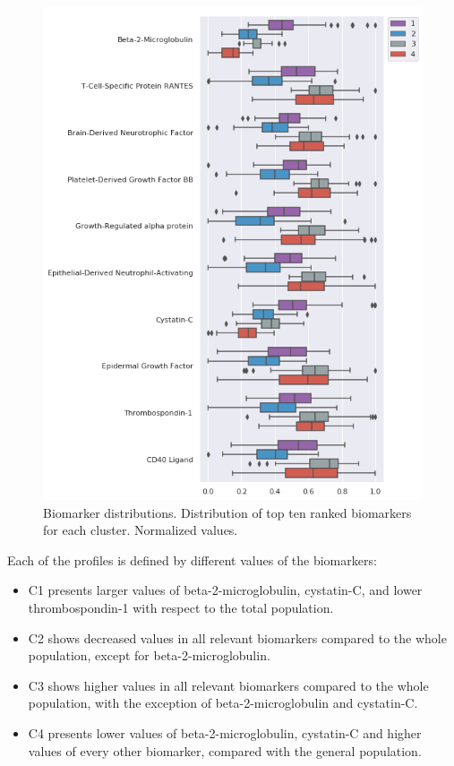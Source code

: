 \begin{figure}[!htbp]
\centering
\includegraphics[width=1.0\textwidth]{figures/cimlr/cluster_dist.png}
    \caption[Biomarker distributions.]{Biomarker distributions. Distribution of top ten ranked biomarkers for each cluster. Normalized values.}
    \label{boxplot}
\end{figure}

Each of the profiles is defined by different values of the biomarkers:

\begin{itemize}
    \item C1 presents larger values of beta-2-microglobulin, cystatin-C, and lower thrombospondin-1 with respect to the total population.
    \item C2 shows decreased values in all relevant biomarkers compared to the whole population, except for beta-2-microglobulin.
    \item C3 shows higher values in all relevant biomarkers compared to the whole population, with the exception of beta-2-microglobulin and cystatin-C.
    \item C4 presents lower values of beta-2-microglobulin, cystatin-C and higher values of every other biomarker, compared with the general population.
\end{itemize}


